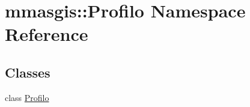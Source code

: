 \hypertarget{namespacemmasgis_1_1Profilo}{
\section{mmasgis::Profilo Namespace Reference}
\label{namespacemmasgis_1_1Profilo}
}
\subsection*{Classes}
\begin{DoxyCompactItemize}
\item 
class \hyperlink{classmmasgis_1_1Profilo_1_1Profilo}{Profilo}
\end{DoxyCompactItemize}
